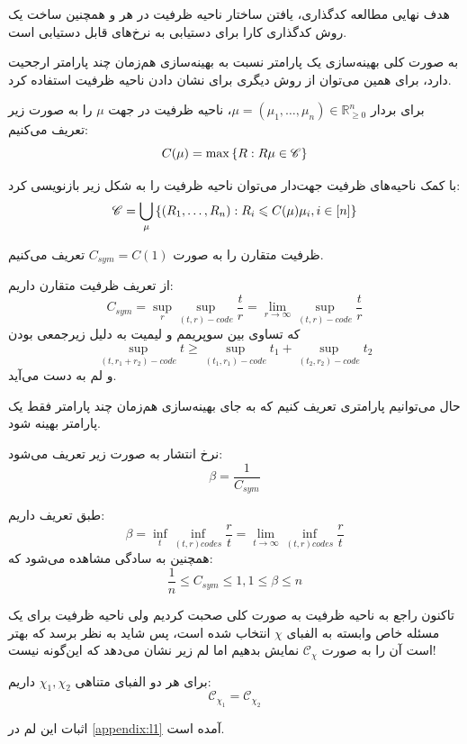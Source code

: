 	هدف نهایی مطالعه کدگذاری، یافتن ساختار ناحیه ظرفیت در هر \icod و همچنین ساخت یک روش کدگذاری کارا برای دستیابی به نرخ‌های قابل دستیابی است.
	
	به صورت کلی بهینه‌سازی یک پارامتر نسبت به بهینه‌سازی هم‌زمان چند پارامتر ارجحیت دارد، برای همین می‌توان از روش دیگری برای نشان دادن ناحیه ظرفیت استفاده کرد.
	\begin{definition}
	برای بردار
	$\mu = (\mu_1, \ldots, \mu_n) \in \mathbb{R}_{\geqslant 0}^n $،
    ناحیه ظرفیت در جهت
	$\mu$
	را به صورت زیر تعریف می‌کنیم:
	$$C(\mu) = \max \left\{ R: R \mu \in \mathscr{C} \right\}$$
\end{definition}

\begin{remark}
	با کمک ناحیه‌های ظرفیت جهت‌دار می‌توان ناحیه ظرفیت را به شکل زیر بازنویسی کرد:
	$$\mathscr{C} = \bigcup\limits_{\mu} \left\{ (R_1, \ldots, R_n): R_i \leqslant C(\mu) \mu_i, i \in [n] \right\}$$
	\begin{definition}
	ظرفیت متقارن را به صورت
	$C_{sym} = C(1) $
	 تعریف می‌کنیم.
	 \end{definition}
\end{remark}

از تعریف ظرفیت متقارن داریم:
$$C_{sym}= \sup\limits_{r} \sup_{(t, r)-code} \dfrac{t}{r} = \lim\limits_{r \rightarrow \infty} \sup_{(t, r)-code} \dfrac{t}{r} $$
که تساوی بین سوپریمم و لیمیت به دلیل زیرجمعی بودن
$$\sup_{(t, r_1 + r_2)-code} t \geqslant \sup_{(t_1, r_1)-code} t_1 + \sup_{(t_2, r_2)-code} t_2$$
و لم
به دست می‌آید.

حال می‌توانیم پارامتری تعریف کنیم که به جای بهینه‌سازی هم‌زمان چند پارامتر فقط یک پارامتر بهینه شود.
\begin{definition}
	نرخ انتشار به صورت زیر تعریف می‌شود:
	$$\beta = \dfrac{1}{C_{sym}}$$
\end{definition}
\begin{remark}
طبق تعریف داریم:
$$\beta = \inf\limits_{t} \inf\limits_{(t, r) codes} \dfrac{r}{t} = \lim\limits_{t \rightarrow \infty} \inf\limits_{(t, r) codes} \dfrac{r}{t}$$
همچنین به سادگی مشاهده می‌شود که:
	$$\dfrac{1}{n} \leq C_{sym} \leq 1, 1 \leq \beta \leq n$$
\end{remark}
تاکنون راجع به ناحیه ظرفیت به صورت کلی صحبت کردیم ولی ناحیه ظرفیت برای یک مسئله خاص وابسته به الفبای
$\chi$
انتخاب شده است، پس شاید به نظر برسد که بهتر است آن را به صورت
$\mathscr{C}_\chi$
نمایش بدهیم اما لم زیر نشان می‌دهد که این‌گونه نیست!
\begin{lemma}
	برای هر دو الفبای متناهی
	$\chi_1, \chi_2$
	داریم:
	$$\mathscr{C}_{\chi_1 }= \mathscr{C}_{\chi_2} $$
\end{lemma}
اثبات این لم در
\autoref{appendix:l1}
 آمده است.

